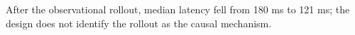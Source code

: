 After the observational rollout, median latency fell from 180 ms to 121 ms; the design does not identify the rollout as the causal mechanism.
